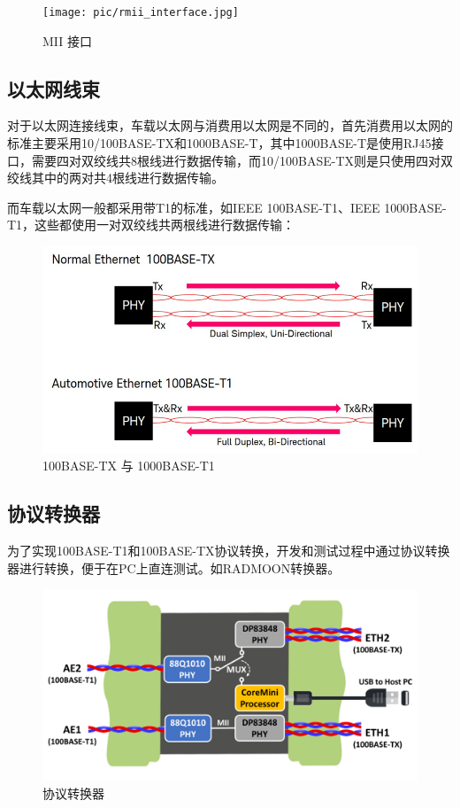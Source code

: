 \begin{figure}[ht]
    \centering
    \texttt{[image: pic/rmii\_interface.jpg]}
    \caption{MII 接口}
    \label{fig:rmii_interface}
\end{figure}

\subsection{以太网线束}
对于以太网连接线束，车载以太网与消费用以太网是不同的，首先消费用以太网的标准主要采用10/100BASE-TX和1000BASE-T，其中1000BASE-T是使用RJ45接口，需要四对双绞线共8根线进行数据传输，而10/100BASE-TX则是只使用四对双绞线其中的两对共4根线进行数据传输。

而车载以太网一般都采用带T1的标准，如IEEE 100BASE-T1、IEEE 1000BASE-T1，这些都使用一对双绞线共两根线进行数据传输：

\begin{figure}[ht]
    \centering
    \includegraphics[scale=1]{pic/100basetT1_Tx.png}
    \caption{100BASE-TX 与 1000BASE-T1}
    \label{fig:100basetT1_Tx}
\end{figure}

\subsection{协议转换器}
为了实现100BASE-T1和100BASE-TX协议转换，开发和测试过程中通过协议转换器进行转换，便于在PC上直连测试。如RADMOON转换器。

\begin{figure}[ht]
    \centering
    \includegraphics[scale=1]{pic/protocal_convert.png}
    \caption{协议转换器}
    \label{fig:protocal_convert}
\end{figure}

